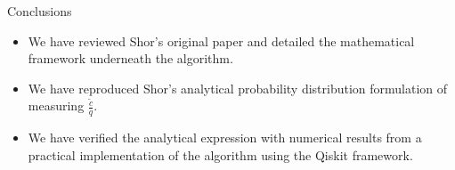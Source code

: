 \begin{frame}{Conclusions}
  \begin{itemize}
    \item We have reviewed Shor's original paper and detailed the mathematical framework underneath the algorithm. 
    \item We have reproduced Shor’s analytical probability distribution formulation of measuring $\frac{\tilde{c}}{q}$.
    \item We have verified the analytical expression  with numerical results from a practical implementation of the algorithm using the Qiskit framework. 
\end{itemize}  
\end{frame}
